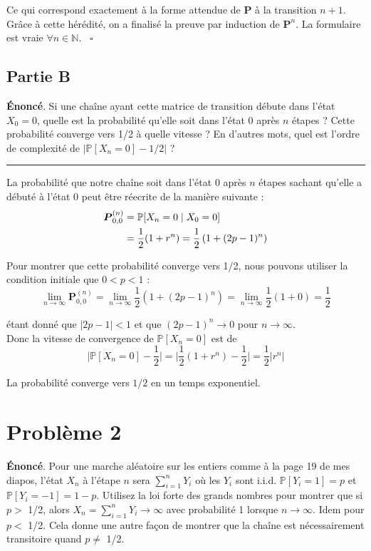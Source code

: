 \documentclass{article}
\begin{document}
    Ce qui correspond exactement à la forme attendue de $\boldsymbol{P}$ à la transition \(n + 1\). Grâce à cette hérédité, on a finalisé la preuve par induction de $\boldsymbol{P}^n$. La formulaire est vraie \(\forall n\in\mathbb{N}\). \ $\square$

\subsection*{Partie B}
    \textbf{Énoncé}. Si une chaîne ayant cette matrice de transition débute dans l'état \(X_0 = 0\), quelle est la probabilité qu'elle soit dans l'état 0 après $n$ étapes ? Cette probabilité converge vers 1/2 à quelle vitesse ? En d'autres mots, quel est l'ordre de complexité de \(\lvert \mathbb{P}[X_n = 0] - 1/2 \rvert\) ?

    \vspace{.5cm}
    \hrule
    \vspace{.5cm}

    La probabilité que notre chaîne soit dans l'état 0 après $n$ étapes sachant qu'elle a débuté à l'état 0 peut être réecrite de la manière suivante :
    \begin{align}
        \boldsymbol{P}^{(n)}_{0,0} &= \mathbb{P}[X_n = 0 \mid X_0 = 0] \notag \\
        &= \frac{1}{2} (1 + r^n) = \frac{1}{2} \left(1 + (2p - 1)^n\right) \notag
    \end{align}

    Pour montrer que cette probabilité converge vers 1/2, nous pouvons utiliser la condition initiale que \(0 < p < 1\) :
    \[
        \lim_{n\to\infty} \boldsymbol{P}^{(n)}_{0,0} = \lim_{n\to\infty} \frac{1}{2} \left(1 + (2p - 1)^n\right) = \lim_{n\to\infty} \frac{1}{2} (1 + 0) = \frac{1}{2}
    \]
    
    étant donné que \(\lvert 2p - 1 \rvert < 1\) et que \((2p - 1)^n \to 0\) pour \(n\to\infty\). \\
    
    Donc la vitesse de convergence de \(\mathbb{P}[X_n = 0]\) est de
    \[
        \Big\lvert \mathbb{P}[X_n = 0] - \frac{1}{2} \Big\rvert = \Big\lvert \frac{1}{2} (1 + r^n) - \frac{1}{2} \Big\rvert = \frac{1}{2} \lvert r^n \rvert 
    \]

    La probabilité converge vers $1/2$ en un temps exponentiel.

\section*{Problème 2}
    \textbf{Énoncé}. Pour une marche aléatoire sur les entiers comme à la page 19 de mes diapos, l'état $X_n$ à l'étape $n$ sera \(\sum^n_{i = 1} Y_i\) où les $Y_i$ sont i.i.d. \(\mathbb{P}[Y_i = 1] = p\) et \(\mathbb{P}[Y_i = -1] = 1 - p\). Utilisez la loi forte des grands nombres pour montrer que si $p >$ 1/2, alors \(X_n = \sum^n_{i = 1} Y_i \to\infty\) avec probabilité 1 lorsque \(n\to\infty\). Idem pour $p <$ 1/2. Cela donne une autre façon de montrer que la chaîne est nécessairement transitoire quand $p \neq$ 1/2.
\end{document}
